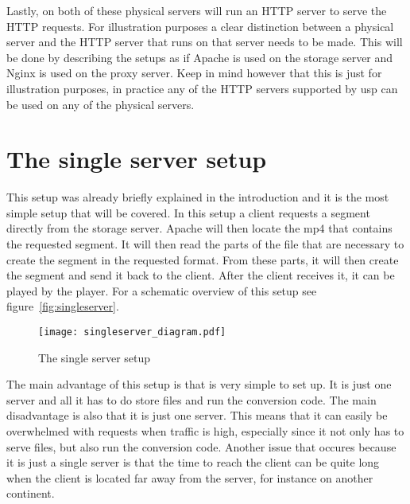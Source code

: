 \documentclass[twoside,openright]{uva-bachelor-thesis}
\begin{document}
Lastly, on both of these physical servers will run an HTTP server to serve the
HTTP requests. For illustration purposes a clear distinction between a
physical server and the HTTP server that runs on that server needs to be made.
This will be done by describing the setups as if Apache is used on the storage
server and Nginx is used on the proxy server. Keep in mind however that this is
just for illustration purposes, in practice any of the HTTP servers supported by
\gls{usp} can be used on any of the physical servers.


\section{The single server setup}
This setup was already briefly explained in the introduction and it is the most
simple setup that will be covered. In this setup a client requests a segment
directly from the storage server. Apache will then locate the mp4 that contains
the requested segment. It will then read the parts of the file that are
necessary to create the segment in the requested format. From these parts, it
will then create the segment and send it back to the client. After the client
receives it, it can be played by the player. For a schematic overview of this
setup see figure~\vref{fig:singleserver}.

\begin{figure}[h]
    \texttt{[image: singleserver\_diagram.pdf]}
    \caption{The single server setup}\label{fig:singleserver}
\end{figure}

The main advantage of this setup is that is very simple to set up. It is just
one server and all it has to do store files and run the conversion code. The
main disadvantage is also that it is just one server. This means that it can
easily be overwhelmed with requests when traffic is high, especially since it
not only has to serve files, but also run the conversion code. Another issue
that occures because it is just a single server is that the time to reach the
client can be quite long when the client is located far away from the server,
for instance on another continent.

\end{document}
